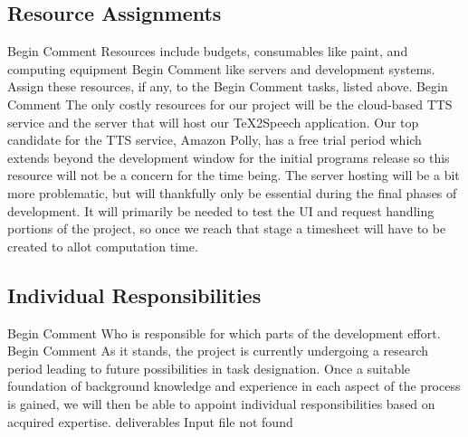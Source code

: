                                                                                                                                                                                                                                                                                                                                                                                                                                                                                                                                                                                                                                                                                                                                                                                                                                                                                                                                                                                                                                                                                                                                                                                                                                                                                                                                                                                                                                                                                                                                                                                                                                                                                                                                                                                                                                                                                                                                                                                                                                                                                                                                                                                                                                                                                                                                                                                                                                                                                                                                                                                                                                                                                                                                                                                                                                                                                                                                                                                                                                                                                                                                                                                                                                                                                                                                                                                                                                                                                                                                                                                                                                                                                                                                                                                                                                                                                                                                                                                                                                                                                                                                                                                                                                                                                                                                                                                                                                                                                                                                                                                                                                                                                                                                                                                                                                                                                                                                                                                                                                                                                                                                                                                                                                                                                                                                                                                                                                                                                                                                                                                                                                                                                                                                                                                                                                                                                                                                                                                                                                                                                                                                                                                                                                                                                                                                                                                                                                                                                                                                                                                                                                                                                                                                                                                                                                                                                                                                \documentclass[letterpaper,12pt]{article}
\begin{document}
\subsection{Resource Assignments}
Begin Comment  Resources include budgets, consumables like paint, and computing equipment
Begin Comment  like servers and development systems.  Assign these resources, if any, to the
Begin Comment  tasks, listed above. 
Begin Comment 
The only costly resources for our project will be the cloud-based TTS service and the server that will host our \TeX 2Speech application. Our top candidate for the TTS service, Amazon Polly, has a free trial period which extends beyond the development window for the initial programs release so this resource will not be a concern for the time being. The server hosting will be a bit more problematic, but will thankfully only be essential during the final phases of development. It will primarily be needed to test the UI and request handling portions of the project, so once we reach that stage a timesheet will have to be created to allot computation time.
\subsection{Individual Responsibilities}
Begin Comment  Who is responsible for which parts of the development effort.
Begin Comment 
As it stands, the project is currently undergoing a research period leading to future possibilities in task designation. Once a suitable foundation of background knowledge and experience in each aspect of the process is gained, we will then be able to appoint individual responsibilities based on acquired expertise.
deliverables Input file not found 

\end{document}
